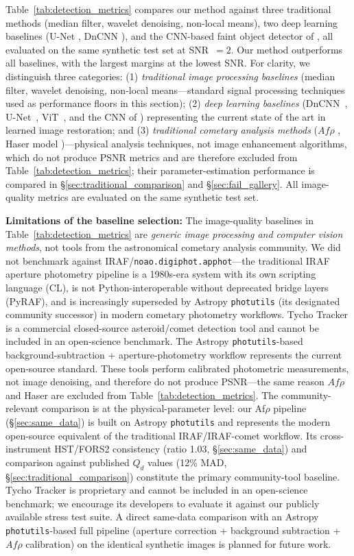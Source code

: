\documentclass[usenatbib]{mnras}
\begin{document}
Table~\ref{tab:detection_metrics} compares our method against three traditional methods (median filter, wavelet denoising, non-local means), two deep learning baselines (U-Net \citealt{ronneberger15}, DnCNN \citealt{zhang17}), and the CNN-based faint object detector of \citet{jiang23}, all evaluated on the same synthetic test set at SNR~$=2$. Our method outperforms all baselines, with the largest margins at the lowest SNR. For clarity, we distinguish three categories: (1) \textit{traditional image processing baselines} (median filter, wavelet denoising, non-local means---standard signal processing techniques used as performance floors in this section); (2) \textit{deep learning baselines} (DnCNN~\citealt{zhang17}, U-Net~\citealt{ronneberger15}, ViT~\citealt{dosovitskiy21}, and the CNN of \citet{jiang23}) representing the current state of the art in learned image restoration; and (3) \textit{traditional cometary analysis methods} ($Af\rho$ \citep{ahearn95}, Haser model \citep{haser57})---physical analysis techniques, not image enhancement algorithms, which do not produce PSNR metrics and are therefore excluded from Table~\ref{tab:detection_metrics}; their parameter-estimation performance is compared in \S\ref{sec:traditional_comparison} and \S\ref{sec:fail_gallery}. All image-quality metrics are evaluated on the same synthetic test set.

\textbf{Limitations of the baseline selection:} The image-quality baselines in Table~\ref{tab:detection_metrics} are \textit{generic image processing and computer vision methods}, not tools from the astronomical cometary analysis community. We did not benchmark against IRAF/\texttt{noao.digiphot.apphot}---the traditional IRAF aperture photometry pipeline is a 1980s-era system with its own scripting language (CL), is not Python-interoperable without deprecated bridge layers (PyRAF), and is increasingly superseded by Astropy \texttt{photutils} (its designated community successor) in modern cometary photometry workflows. Tycho Tracker is a commercial closed-source asteroid/comet detection tool and cannot be included in an open-science benchmark. The Astropy \texttt{photutils}-based background-subtraction + aperture-photometry workflow represents the current open-source standard. These tools perform calibrated photometric measurements, not image denoising, and therefore do not produce PSNR---the same reason $Af\rho$ and Haser are excluded from Table~\ref{tab:detection_metrics}. The community-relevant comparison is at the physical-parameter level: our Af$\rho$ pipeline (\S\ref{sec:same_data}) is built on Astropy \texttt{photutils} and represents the modern open-source equivalent of the traditional IRAF/IRAF-comet workflow. Its cross-instrument HST/FORS2 consistency (ratio 1.03, \S\ref{sec:same_data}) and comparison against published $Q_d$ values (12\% MAD, \S\ref{sec:traditional_comparison}) constitute the primary community-tool baseline. Tycho Tracker is proprietary and cannot be included in an open-science benchmark; we encourage its developers to evaluate it against our publicly available stress test suite. A direct same-data comparison with an Astropy \texttt{photutils}-based full pipeline (aperture correction + background subtraction + $Af\rho$ calibration) on the identical synthetic images is planned for future work.
\end{document}
